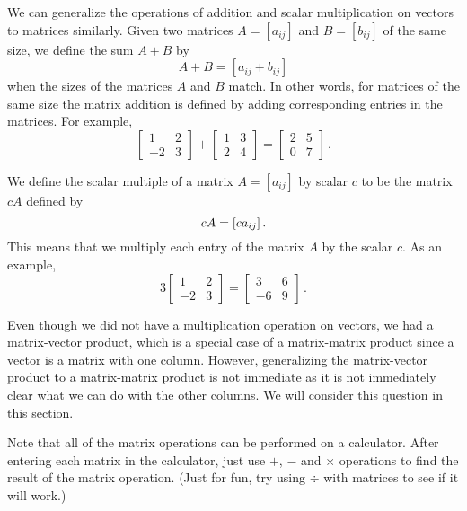 We can generalize the operations of addition and scalar multiplication on vectors to matrices similarly. Given two matrices $A=[a_{ij}]$ and $B=[b_{ij}]$ of the same size, we define the sum $A+B$ by
\[ A+B= [ a_{ij}+b_{ij} ] \]
when the sizes of the matrices $A$ and $B$ match. In other words, for matrices of the same size the matrix addition is defined by adding corresponding entries in the matrices. For example,
\[ \left[ \begin{array}{rc} 1 & 2 \\ -2 & 3  \end{array} \right] + \left[ \begin{array}{cc} 1 & 3 \\ 2 & 4  \end{array} \right] = \left[ \begin{array}{cc} 2 & 5 \\ 0 & 7  \end{array} \right]  \,.\]

We define the scalar multiple of a matrix $A=[a_{ij}]$ by scalar $c$ to be the matrix $cA$ defined by
\[ cA= [ ca_{ij}] \, .\index{matrix!scalar multiple}\]
This means that we multiply each entry of the matrix $A$ by the scalar $c$. As an example, 
\[ 3 \left[ \begin{array}{rc} 1 & 2 \\ -2 & 3  \end{array} \right] = \left[ \begin{array}{rc} 3 & 6 \\ -6 & 9  \end{array} \right] \,.\]

Even though we did not have a multiplication operation on vectors, we had a matrix-vector product, which is a special case of a matrix-matrix product since a vector is a matrix with one column. However, generalizing the matrix-vector product to a matrix-matrix product is not immediate as it is not immediately clear what we can do with the other columns. We will consider this question in this section.

Note that all of the matrix operations can be performed on a calculator. After entering each matrix in the calculator, just use $+$, $-$ and $\times$ operations to find the result of the matrix operation. (Just for fun, try using $\div$ with matrices to see if it will work.)\\

